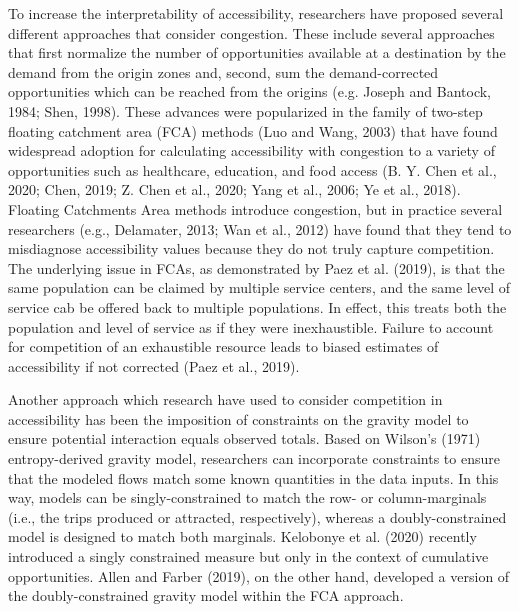 \documentclass[]{elsarticle} %
\begin{document}
To increase the interpretability of accessibility, researchers have
proposed several different approaches that consider congestion. These
include several approaches that first normalize the number of
opportunities available at a destination by the demand from the origin
zones and, second, sum the demand-corrected opportunities which can be
reached from the origins (e.g. Joseph and Bantock, 1984; Shen, 1998).
These advances were popularized in the family of two-step floating
catchment area (FCA) methods (Luo and Wang, 2003) that have found
widespread adoption for calculating accessibility with congestion to a
variety of opportunities such as healthcare, education, and food access
(B. Y. Chen et al., 2020; Chen, 2019; Z. Chen et al., 2020; Yang et al.,
2006; Ye et al., 2018). Floating Catchments Area methods introduce
congestion, but in practice several researchers (e.g., Delamater, 2013;
Wan et al., 2012) have found that they tend to misdiagnose accessibility
values because they do not truly capture competition. The underlying
issue in FCAs, as demonstrated by Paez et al. (2019), is that the same
population can be claimed by multiple service centers, and the same
level of service cab be offered back to multiple populations. In effect,
this treats both the population and level of service as if they were
inexhaustible. Failure to account for competition of an exhaustible
resource leads to biased estimates of accessibility if not corrected
(Paez et al., 2019).

Another approach which research have used to consider competition in
accessibility has been the imposition of constraints on the gravity
model to ensure potential interaction equals observed totals. Based on
Wilson's (1971) entropy-derived gravity model, researchers can
incorporate constraints to ensure that the modeled flows match some
known quantities in the data inputs. In this way, models can be
singly-constrained to match the row- or column-marginals (i.e., the
trips produced or attracted, respectively), whereas a doubly-constrained
model is designed to match both marginals. Kelobonye et al. (2020)
recently introduced a singly constrained measure but only in the context
of cumulative opportunities. Allen and Farber (2019), on the other hand,
developed a version of the doubly-constrained gravity model within the
FCA approach.
\end{document}
